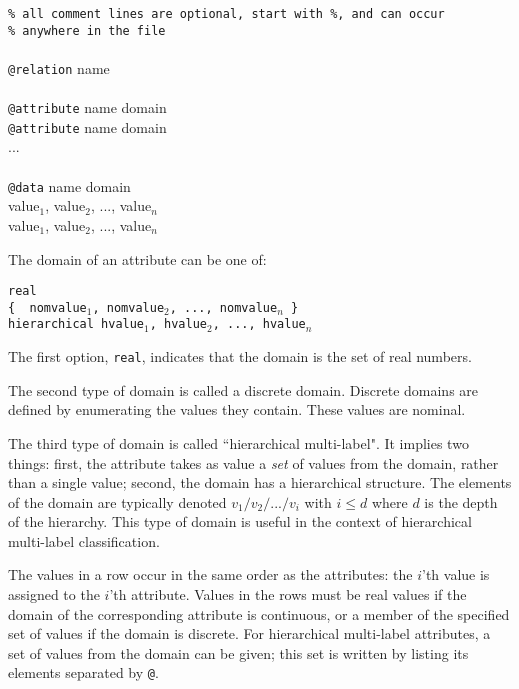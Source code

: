 \documentclass[a4paper]{report}
\begin{document}
\begin{tabbing}
{\tt \% all comment lines are optional, start with \%, and can occur }\\
{\tt \% anywhere in the file}\\
\\
{\tt @relation} name\\
\\
{\tt @attribute} name domain\\
{\tt @attribute} name domain\\
...\\
\\
{\tt @data} name domain\\
value$_1$, value$_2$, ..., value$_n$\\
value$_1$, value$_2$, ..., value$_n$\\
\end{tabbing}

The domain of an attribute can be one of:
\begin{tabbing}
\tt real\\
{\tt \{ } nomvalue$_1$, nomvalue$_2$, ..., nomvalue$_n$ {\tt \} }\\
{\tt hierarchical} hvalue$_1$, hvalue$_2$, ..., hvalue$_n$
\end{tabbing}

The first option, {\tt real}, indicates that the domain is the set of real numbers.

The second type of domain is called a discrete domain.  Discrete domains are defined by enumerating the values they contain.  These values are nominal.

The third type of domain is called ``hierarchical multi-label".  It implies two things: first, the attribute takes as value a {\em set} of values from the domain, rather than a single value; second, the domain has a hierarchical structure.  The elements of the domain are typically denoted $v_1/v_2/.../v_i$ with $i \leq d$ where $d$ is the depth of the hierarchy.  This type of domain is useful in the context of hierarchical multi-label classification.  

The values in a	 row occur in the same order as the attributes: the $i$'th value is assigned to the $i$'th attribute.  Values in the rows must be real values if the domain of the corresponding attribute is continuous, or a member of the specified set of values if the domain is discrete.  For hierarchical multi-label attributes, a set of values from the domain can be given; this set is written by listing its elements separated by \verb^@^.
\end{document}
